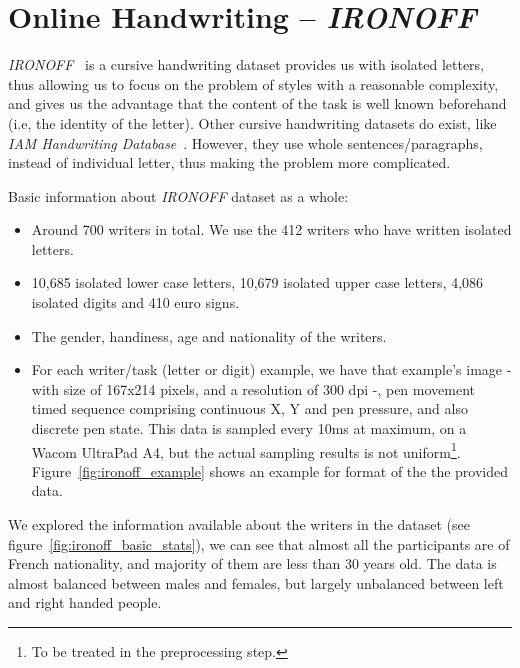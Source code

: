 \clearpage

\section{Online Handwriting -- \textit{IRONOFF}}

\par \textit{IRONOFF}~\citep{791823} is a cursive handwriting dataset provides us with isolated letters, thus allowing us to focus on the problem of styles with a reasonable complexity, and gives us the advantage that the content of the task is well known beforehand (i.e, the identity of the letter). Other cursive handwriting datasets do exist, like \textit{IAM Handwriting Database}~\citep{marti1999full}. However, they use whole sentences/paragraphs, instead of individual letter, thus making the problem more complicated.

Basic information about \textit{IRONOFF} dataset as a whole:
\begin{itemize}
    \item Around 700 writers in total. We use the 412 writers who have written isolated letters.
    \item 10,685 isolated lower case letters, 10,679 isolated upper case letters, 4,086 isolated digits and 410 euro signs.
    \item The gender, handiness, age and nationality of the writers.
    \item For each writer/task (letter or digit) example, we have that example's image - with size of 167x214 pixels, and a resolution of 300 dpi -, pen movement timed sequence comprising continuous X, Y and pen pressure, and also discrete pen state. This data is sampled every 10ms at maximum, on a Wacom UltraPad A4, but the actual sampling results is not uniform\footnote{To be treated in the preprocessing step.}. Figure~\ref{fig:ironoff_example} shows an example for format of the the provided data.
\end{itemize}

\par We explored the information available about the writers in the dataset (see figure~\ref{fig:ironoff_basic_stats}), we can see that almost all the participants are of French nationality, and majority of them are less than 30 years old. The data is almost balanced between males and females, but largely unbalanced between left and right handed people. %

